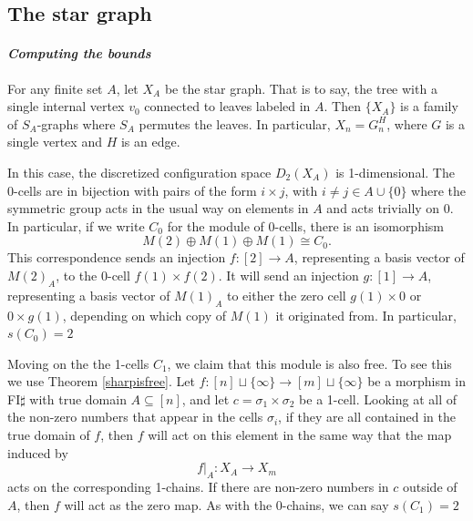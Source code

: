 \documentclass[12pt]{amsart}
\theoremstyle{definition}
\begin{document}
\subsection{The star graph}
\paragraph{\textit{Computing the bounds}}
For any finite set $A$, let $X_A$ be the star graph. That is to say, the tree with a single internal vertex $v_0$ connected to leaves labeled in $A$. Then $\{X_A\}$ is a family of $S_A$-graphs where $S_A$ permutes the leaves. In particular, $X_n = G^H_n$, where $G$ is a single vertex and $H$ is an edge.

In this case, the discretized configuration space $D_2(X_A)$ is 1-dimensional. The 0-cells are in bijection with pairs of the form $i \times j$, with $i \neq j \in A \cup \{0\}$ where the symmetric group acts in the usual way on elements in $A$ and acts trivially on $0$. In particular, if we write $C_0$ for the module of 0-cells, there is an isomorphism
\[
M(2) \oplus M(1) \oplus M(1) \cong C_0.
\]
This correspondence sends an injection $f:[2] \rightarrow A$, representing a basis vector of $M(2)_A$, to the 0-cell $f(1) \times f(2)$. It will send an injection $g:[1] \rightarrow A$, representing a basis vector of $M(1)_A$ to either the zero cell $g(1) \times 0$ or $0 \times g(1)$, depending on which copy of $M(1)$ it originated from. In particular, $s(C_0)=  2$

Moving on the the 1-cells $C_1$, we claim that this module is also free. To see this we use Theorem \ref{sharpisfree}. Let $f:[n] \sqcup \{\infty\} \rightarrow [m] \sqcup \{\infty\}$ be a morphism in FI$\sharp$ with true domain $A \subseteq [n]$, and let $c = \sigma_1 \times \sigma_2$ be a 1-cell. Looking at all of the non-zero numbers that appear in the cells $\sigma_i$, if they are all contained in the true domain of $f$, then $f$ will act on this element in the same way that the map induced by
\[
f|_A: X_A \rightarrow X_m
\]
acts on the corresponding 1-chains. If there are non-zero numbers in $c$ outside of $A$, then $f$ will act as the zero map. As with the 0-chains, we can say $s(C_1) = 2$
\end{document}

